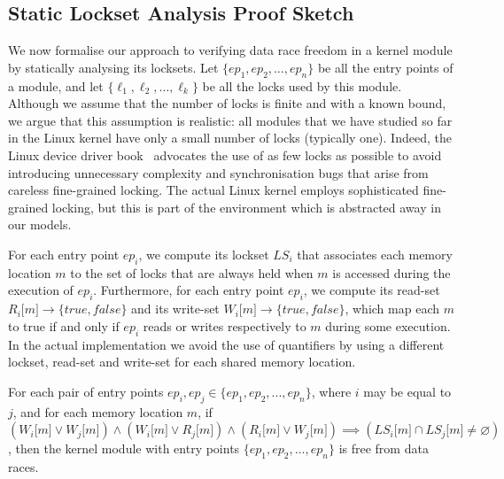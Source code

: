 \subsection{Static Lockset Analysis Proof Sketch}
\label{proof}

We now formalise our approach to verifying data race freedom in a kernel module by statically analysing its locksets. Let $\{\mathit{ep}_{1}, \mathit{ep}_{2}, \dotsc, \mathit{ep}_{n}\}$ be all the entry points of a module, and let $\{\ell_{1}, \ell_{2}, \dotsc, \ell_{k}\}$ be all the locks used by this module. Although we assume that the number of locks is finite and with a known bound, we argue that this assumption is realistic: all modules that we have studied so far in the Linux kernel have only a small number of locks (typically one). Indeed, the Linux device driver book~\cite{corbet2005linux} advocates the use of as few locks as possible to avoid introducing unnecessary complexity and synchronisation bugs that arise from careless fine-grained locking. The actual Linux kernel employs sophisticated fine-grained locking, but this is part of the environment which is abstracted away in our models.

For each entry point $\mathit{ep}_{i}$, we compute its lockset $\mathit{LS}_{i}$ that associates each memory location $m$ to the set of locks that are always held when $m$ is accessed during the execution of $\mathit{ep}_{i}$. Furthermore, for each entry point $\mathit{ep}_{i}$, we compute its read-set $R_{i}\lbrack m\rbrack \rightarrow \{true, false\}$ and its write-set $W_{i}\lbrack m\rbrack \rightarrow \{true, false\}$, which map each $m$ to true if and only if $\mathit{ep}_{i}$ reads or writes respectively to $m$ during some execution. In the actual implementation we avoid the use of quantifiers by using a different lockset, read-set and write-set for each shared memory location. 

\begin{theorem}
\label{theorem:locksets}
For each pair of entry points $\mathit{ep}_{i}, \mathit{ep}_{j}\in \{\mathit{ep}_{1}, \mathit{ep}_{2}, ..., \mathit{ep}_{n}\}$, where $i$ may be equal to $j$, and for each memory location $m$, if $(W_{i}\lbrack m\rbrack \vee W_{j}\lbrack m\rbrack) \wedge (W_{i}\lbrack m\rbrack \vee R_{j}\lbrack m\rbrack) \wedge (R_{i}\lbrack m\rbrack \vee W_{j}\lbrack m\rbrack) \implies (\mathit{LS}_{i}\lbrack m\rbrack \cap \mathit{LS}_{j}\lbrack m\rbrack \not= \varnothing)$, then the kernel module with entry points $\{\mathit{ep}_{1}, \mathit{ep}_{2}, \dotsc, \mathit{ep}_{n}\}$ is free from data races.
\end{theorem}

